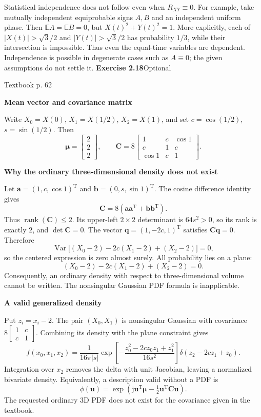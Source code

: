 \documentclass[a4paper,11pt]{article}
\newcommand{\E}{\mathbb E}\newcommand{\Var}{\operatorname{Var}}\newcommand{\Cov}{\operatorname{Cov}}
\newcommand{\jj}{\mathrm j}\newcommand{\ee}{\mathrm e}
\newcommand{\problem}[3]{{\LARGE\bfseries Exercise #1}\hfill #2\par{\small\color{gray}Textbook p. #3}\par\vspace{3mm}}
\newcommand{\step}[1]{\par\textbf{#1}\par}
\begin{document}
Statistical independence does not follow even when $R_{XY}\equiv0$. For example, take mutually independent equiprobable signs $A,B$ and an independent uniform phase. Then $\E A=\E B=0$, but
$X(t)^2+Y(t)^2=1$. More explicitly, each of $|X(t)|>\sqrt3/2$ and $|Y(t)|>\sqrt3/2$ has probability $1/3$, while their intersection is impossible. Thus even the equal-time variables are dependent. Independence is possible in degenerate cases such as $A\equiv0$; the given assumptions do not settle it.
\endgroup
\newpage
\problem{2.18}{Optional}{62}
\step{Mean vector and covariance matrix}
Write $X_0=X(0)$, $X_1=X(1/2)$, $X_2=X(1)$, and set $c=\cos(1/2)$, $s=\sin(1/2)$. Then
\[
\boldsymbol\mu=\begin{bmatrix}2\\2\\2\end{bmatrix},\qquad
\boldsymbol C=8\begin{bmatrix}1&c&\cos1\\c&1&c\\\cos1&c&1\end{bmatrix}.
\]
\step{Why the ordinary three-dimensional density does not exist}
Let $\boldsymbol a=(1,c,\cos1)^{\mathrm T}$ and
$\boldsymbol b=(0,s,\sin1)^{\mathrm T}$. The cosine difference identity gives
\[
\boldsymbol C=8(\boldsymbol a\boldsymbol a^{\mathrm T}+\boldsymbol b\boldsymbol b^{\mathrm T}).
\]
Thus $\operatorname{rank}(\boldsymbol C)\le2$. Its upper-left $2\times2$ determinant is $64s^2>0$, so its rank is exactly $2$, and $\det\boldsymbol C=0$.
The vector $\boldsymbol q=(1,-2c,1)^{\mathrm T}$ satisfies $\boldsymbol C\boldsymbol q=0$. Therefore
\[
\Var\bigl[(X_0-2)-2c(X_1-2)+(X_2-2)\bigr]=0,
\]
so the centered expression is zero almost surely. All probability lies on a plane:
\[
\boxed{(X_0-2)-2c(X_1-2)+(X_2-2)=0.}
\]
Consequently, an ordinary density with respect to three-dimensional volume cannot be written. The nonsingular Gaussian PDF formula is inapplicable.
\step{A valid generalized density}
Put $z_i=x_i-2$. The pair $(X_0,X_1)$ is nonsingular Gaussian with covariance $8\begin{bmatrix}1&c\\c&1\end{bmatrix}$. Combining its density with the plane constraint gives
\[
\boxed{f(x_0,x_1,x_2)=\frac1{16\pi|s|}
\exp\left[-\frac{z_0^2-2cz_0z_1+z_1^2}{16s^2}\right]
\delta(z_2-2cz_1+z_0).}
\]
Integration over $x_2$ removes the delta with unit Jacobian, leaving a normalized bivariate density. Equivalently, a description valid without a PDF is
\[
\boxed{\phi(\boldsymbol u)=\exp\left(\jj\boldsymbol u^{\mathrm T}\boldsymbol\mu-\tfrac12\boldsymbol u^{\mathrm T}\boldsymbol C\boldsymbol u\right).}
\]
The requested ordinary 3D PDF does not exist for the covariance given in the textbook.
\end{document}
